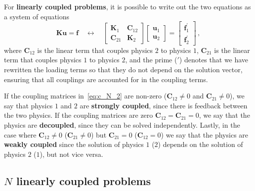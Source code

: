     For \textbf{linearly coupled problems}, it is possible to write out the two equations as a system of equations
    \begin{equation}\label{eq:c_N_2}
 \mathbf{K} \mathbf{u} = \mathbf{f} \quad \longleftrightarrow \quad 
        \begin{bmatrix}
 \mathbf{K}_1  & \mathbf{C}_{12} \\
 \mathbf{C}_{21} & \mathbf{K}_2
        \end{bmatrix}
        \begin{bmatrix}
 \mathbf{u}_1 \\
 \mathbf{u}_2
        \end{bmatrix}
 =
        \begin{bmatrix}
 \mathbf{f}_1^\prime \\
 \mathbf{f}_2^\prime
        \end{bmatrix}\,,
    \end{equation}
 where $\mathbf{C}_{12}$ is the linear term that couples physics $2$ to physics $1$,
$\mathbf{C}_{21}$ is the linear term that couples physics $1$ to physics $2$, and the
 prime ($\prime$) denotes that we have rewritten the loading terms so that they do not
 depend on the solution vector, ensuring that all couplings are
 accounted for in the coupling terms. 
 
 If the coupling
 matrices in~\eqref{eq:c_N_2} are non-zero ($\mathbf{C}_{12}\neq 0$ and $\mathbf{C}_{21}\neq 0$), we
 say that physics $1$ and $2$ are
    \textbf{strongly coupled}, since there is feedback between the two physics. If the
 coupling matrices are zero $\mathbf{C}_{12}=\mathbf{C}_{21}=0$, we say that the
 physics
 are \textbf{decoupled}, since they can be solved independently. Lastly, in the
 case where $\mathbf{C}_{12}\neq 0$ ($\mathbf{C}_{21}\neq 0$) but $\mathbf{C}_{21} = 0$ ($\mathbf{C}_{12} = 0$) we say that the
 physics are \textbf{weakly
 coupled} since the solution of physics $1$ ($2$) depends on the solution of physics
$2$ ($1$), but not vice versa.

\subsection*{$N$ linearly coupled problems}

